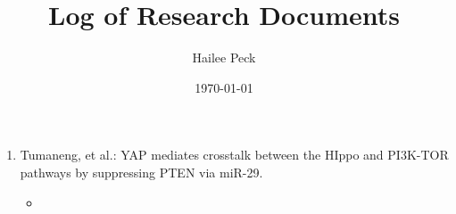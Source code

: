 \documentclass[12pt]{article}
\begin{document}
\sffamily
\title{Log of Research Documents}
\date{\today}
\author{Hailee Peck}
\maketitle

\begin{enumerate}
\item Tumaneng, et al.: YAP mediates crosstalk between the HIppo and PI3K-TOR pathways by suppressing PTEN via miR-29.
\begin{itemize}
	\item 
\end{itemize}

\end{enumerate}
\end{document}
